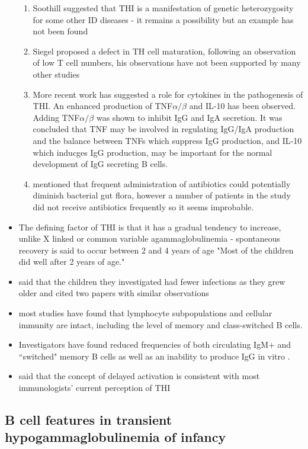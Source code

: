 \documentclass[12pt]{article}
\begin{document}
\begin{itemize}
\begin{enumerate}
					\item Soothill suggested that THI is a manifestation of genetic heterozygosity for some other ID diseases - it remains a possibility but an example has not been found 
					\item Siegel proposed a defect in TH cell maturation, following an observation of low T cell numbers, his observations have not been supported by many other studies
					\item More recent work has suggested a role for cytokines in the pathogenesis of THI. An enhanced production of TNF$\alpha/\beta$ and IL-10 has been observed. Adding TNF$\alpha/\beta$ was shown to inhibit IgG and IgA secretion. It was concluded that TNF may be involved in regulating IgG/IgA production and the balance between TNFs which suppress IgG production, and IL-10 which inducges IgG production, may be important for the normal development of IgG secreting B cells.
					\item \citet{McGeady87} mentioned that frequent administration of antibiotics could potentially diminish bacterial gut flora, however a number of patients in the study did not receive antibiotics frequently so it seems improbable.
				\end{enumerate}
				\item The defining factor of THI is that it has a gradual tendency to increase, unlike X linked or common variable agammaglobulinemia - spontaneous recovery is said to occur between 2 and 4 years of age \citep{Tiller78} "Most of the children did well after 2 years of age." \citep{McGeady87}
				\item \citet{McGeady87} said that the children they investigated had fewer infections as they grew older and cited two papers with similar observations
				\item most studies have found that lymphocyte subpopulations and cellular immunity are intact, including the level of memory and class-switched B cells. 
				\item Investigators have found reduced frequencies of both circulating IgM+ and ``switched" memory B cells as well as an inability to produce IgG in vitro \citep{Ovadia14}.
				\item \citet{McGeady87} said that the concept of delayed activation is consistent with most immunologists' current perception of THI
			\end{itemize} 
			
		\subsection{B cell features in transient hypogammaglobulinemia of infancy}
			
\end{document}
